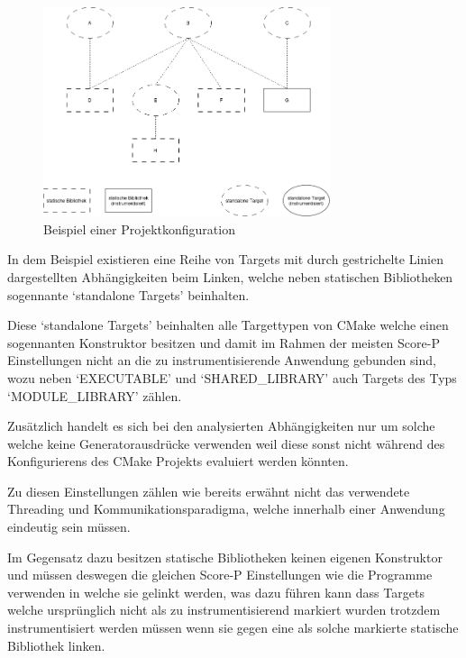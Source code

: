 \documentclass[german,proseminar,hyperref,utf8]{zihpub}
\begin{document}
    \begin{figure}[ht]
        \begin{center}
            \includegraphics[width=0.75\textwidth]{analysis_before.drawio.png}
            \caption{Beispiel einer Projektkonfiguration}
            \label{fig:analysis_example}
        \end{center}
    \end{figure}

    In dem Beispiel existieren eine Reihe von Targets mit durch gestrichelte Linien dargestellten
    Abhängigkeiten beim Linken, welche neben statischen Bibliotheken sogennante `standalone Targets'
    beinhalten.

    Diese `standalone Targets' beinhalten alle Targettypen von CMake welche einen sogennanten
    Konstruktor besitzen und damit im Rahmen der meisten Score-P Einstellungen nicht an die
    zu instrumentisierende Anwendung gebunden sind, wozu neben `EXECUTABLE' und `SHARED\_LIBRARY'
    auch Targets des Typs `MODULE\_LIBRARY' zählen.

    Zusätzlich handelt es sich bei den analysierten Abhängigkeiten nur um solche welche keine
    Generatorausdrücke verwenden weil diese sonst nicht während des Konfigurierens des CMake
    Projekts evaluiert werden könnten.

    Zu diesen Einstellungen zählen wie bereits erwähnt nicht das verwendete Threading und
    Kommunikationsparadigma, welche innerhalb einer Anwendung eindeutig sein müssen.

    Im Gegensatz dazu besitzen statische Bibliotheken keinen eigenen Konstruktor und müssen deswegen
    die gleichen Score-P Einstellungen wie die Programme verwenden in welche sie gelinkt werden, was
    dazu führen kann dass Targets welche ursprünglich nicht als zu instrumentisierend markiert wurden
    trotzdem instrumentisiert werden müssen wenn sie gegen eine als solche markierte statische
    Bibliothek linken.
\end{document}
